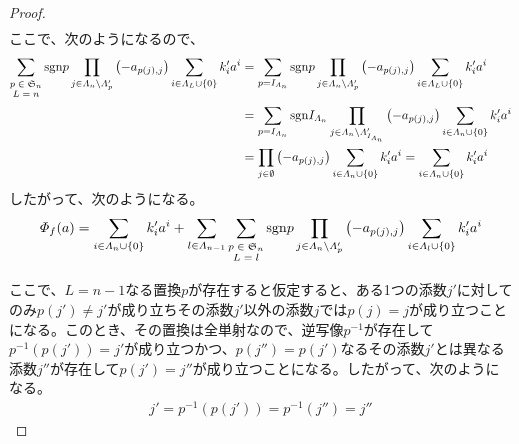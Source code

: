 \documentclass[dvipdfmx]{jsarticle}
\begin{document}
\begin{proof}
\begin{align*}
\end{align*}
ここで、次のようになるので、
\begin{align*}
\sum_{\scriptsize \begin{matrix} p \in \mathfrak{S}_{n} \\ L = n\\\end{matrix}} {{\mathrm{sgn} }p\prod_{j \in \varLambda_{n} \setminus \varLambda_{p}' } \left( - a_{p(j),j} \right)\sum_{i \in \varLambda_{L} \cup \left\{ 0 \right\}} {k_{i}'a^{i}}} &= \sum_{p = I_{\varLambda_{n}}} {{\mathrm{sgn} }p\prod_{j \in \varLambda_{n} \setminus \varLambda_{p}' } \left( - a_{p(j),j} \right)\sum_{i \in \varLambda_{L} \cup \left\{ 0 \right\}} {k_{i}'a^{i}}}\\
&= \sum_{p = I_{\varLambda_{n}}} {{\mathrm{sgn} }I_{\varLambda_{n}}\prod_{j \in \varLambda_{n} \setminus \varLambda_{I_{\varLambda_{n}}}' } \left( - a_{p(j),j} \right)\sum_{i \in \varLambda_{n} \cup \left\{ 0 \right\}} {k_{i}'a^{i}}}\\
&= \prod_{j \in \emptyset } \left( - a_{p(j),j} \right)\sum_{i \in \varLambda_{n} \cup \left\{ 0 \right\}} {k_{i}'a^{i}} = \sum_{i \in \varLambda_{n} \cup \left\{ 0 \right\}} {k_{i}'a^{i}}
\end{align*}
したがって、次のようになる。
\begin{align*}
\varPhi_{f}(a) = \sum_{i \in \varLambda_{n} \cup \left\{ 0 \right\}} {k_{i}'a^{i}} + \sum_{l \in \varLambda_{n - 1}} {\sum_{\scriptsize \begin{matrix} p \in \mathfrak{S}_{n} \\ L = l \\\end{matrix}} {{\mathrm{sgn} }p\prod_{j \in \varLambda_{n} \setminus \varLambda_{p}' } \left( - a_{p(j),j} \right)\sum_{i \in \varLambda_{l} \cup \left\{ 0 \right\}} {k_{i}'a^{i}}}}
\end{align*}\par
ここで、$L = n - 1$なる置換$p$が存在すると仮定すると、ある1つの添数$j'$に対してのみ$p\left( j' \right) \neq j'$が成り立ちその添数$j'$以外の添数$j$では$p(j) = j$が成り立つことになる。このとき、その置換は全単射なので、逆写像$p^{- 1}$が存在して$p^{- 1}\left( p\left( j' \right) \right) = j'$が成り立つかつ、$p\left( j'' \right) = p\left( j' \right)$なるその添数$j'$とは異なる添数$j''$が存在して$p\left( j' \right) = j''$が成り立つことになる。したがって、次のようになる。
\begin{align*}
j' = p^{- 1}\left( p\left( j' \right) \right) = p^{- 1}\left( j'' \right) = j''

\end{align*}
\end{proof}
\end{document}
